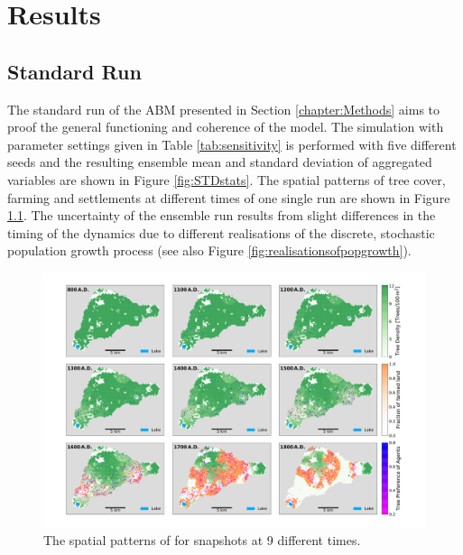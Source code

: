 \chapter{Results}

\section{Standard Run}
The standard run of the ABM presented in Section \ref{chapter:Methods} aims to proof the general functioning and coherence of the model.
The simulation with parameter settings given in Table \ref{tab:sensitivity} is performed with five different seeds and the resulting ensemble mean and standard deviation of aggregated variables are shown in Figure \ref{fig:STDstats}.
The spatial patterns of tree cover, farming and settlements at different times of one single run are shown in Figure \ref{fig:STDrull}.
The uncertainty of the ensemble run results from slight differences in the timing of the dynamics due to different realisations of the discrete, stochastic population growth process (see also Figure \ref{fig:realisationsofpopgrowth}).

\begin{figure}
	\centering
	\includegraphics[width=1.5\textwidth, center]{images/Results/Standard/Rull2020_Comparison_seed3}
	\caption{The spatial patterns of for snapshots at 9 different times.}
	\label{fig:STDrull}
\end{figure}


